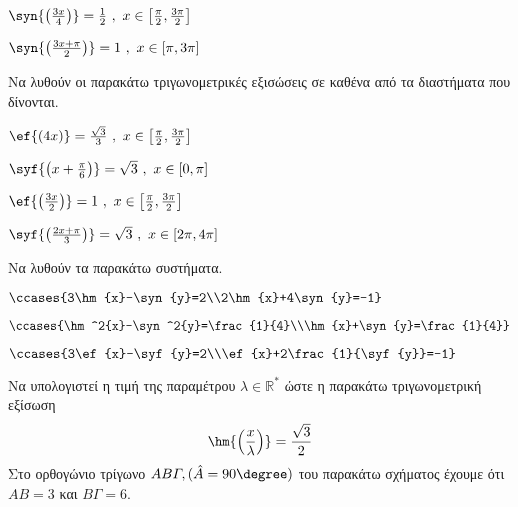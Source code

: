 \begin{multicols}{2}
\begin{rlist}
\item $ \syn{\left(\frac{3x}{4}\right) }=\frac{1}{2}\ ,\ x\in\left[\frac{\pi}{2},\frac{3\pi}{2}\right]  $
\item $ \syn{\left(\frac{3x+\pi}{2}\right) }=1\ ,\ x\in[\pi,3\pi] $
\end{rlist}
\Askhsh Να λυθούν οι παρακάτω τριγωνομετρικές εξισώσεις σε καθένα από τα διαστήματα που δίνονται.
\begin{rlist}
\item $ \ef{(4x)}=\frac{\sqrt{3}}{3}\ ,\ x\in\left[\frac{\pi}{2},\frac{3\pi}{2}\right]  $
\item $ \syf{\left(x+\frac{\pi}{6}\right) }=\sqrt{3}\ ,\ x\in[0,\pi] $
\item $ \ef{\left(\frac{3x}{2}\right) }=1\ ,\ x\in\left[\frac{\pi}{2},\frac{3\pi}{2}\right]  $
\item $ \syf{\left(\frac{2x+\pi}{3}\right) }=\sqrt{3}\ ,\ x\in[2\pi,4\pi] $
\end{rlist}
\Askhsh 
Να λυθούν τα παρακάτω συστήματα.
\begin{rlist}
\item $ \ccases{3\hm{x}-\syn{y}=2\\2\hm{x}+4\syn{y}=-1} $
\item $ \ccases{\hm^2{x}-\syn^2{y}=\frac{1}{4}\\\hm{x}+\syn{y}=\frac{1}{4}} $
\item $ \ccases{3\ef{x}-\syf{y}=2\\\ef{x}+2\frac{1}{\syf{y}}=-1} $
\end{rlist}
\Askhsh Να υπολογιστεί η τιμή της παραμέτρου $ \lambda\in\mathbb{R}^* $ ώστε η παρακάτω τριγωνομετρική εξίσωση \[ \hm{\left( \frac{x}{\lambda}\right) }=\frac{\sqrt{3}}{2} \]
\Askhsh Στο ορθογώνιο τρίγωνο $ AB\varGamma,(\hat{A}=90\degree) $ του παρακάτω σχήματος έχουμε ότι $ AB=3 $ και $ B\varGamma=6 $.
\begin{center}

\end{center}
\end{multicols}
